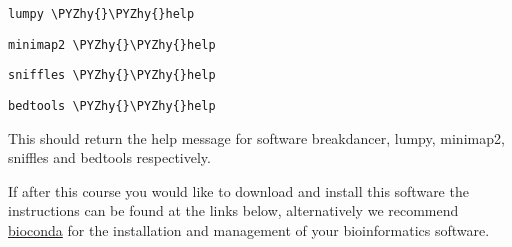 \documentclass[11pt]{article}
\makeatletter
\def\PYZhy{\char`\-}
\newcommand{\boxspacing}{\kern\kvtcb@left@rule\kern\kvtcb@boxsep}
\newcommand{\prompt}[4]{
        {\ttfamily\llap{{\color{blue}\LARGE\faKeyboardO\hspace{3pt}#4}}\vspace{-\baselineskip}}
    }
\makeatother
\begin{document}
    \begin{Verbatim}[commandchars=\\\{\}, frame=single, framerule=2mm, rulecolor=\color{outerrorbackground}]
    \end{Verbatim}

    \begin{tcolorbox}[breakable, size=fbox, boxrule=1pt, pad at break*=1mm,colback=cellbackground, colframe=cellborder]
\prompt{In}{incolor}{ }{\boxspacing}
\begin{Verbatim}[commandchars=\\\{\}]
lumpy \PYZhy{}\PYZhy{}help
\end{Verbatim}
\end{tcolorbox}

    \begin{tcolorbox}[breakable, size=fbox, boxrule=1pt, pad at break*=1mm,colback=cellbackground, colframe=cellborder]
\prompt{In}{incolor}{ }{\boxspacing}
\begin{Verbatim}[commandchars=\\\{\}]
minimap2 \PYZhy{}\PYZhy{}help
\end{Verbatim}
\end{tcolorbox}

    \begin{tcolorbox}[breakable, size=fbox, boxrule=1pt, pad at break*=1mm,colback=cellbackground, colframe=cellborder]
\prompt{In}{incolor}{ }{\boxspacing}
\begin{Verbatim}[commandchars=\\\{\}]
sniffles \PYZhy{}\PYZhy{}help
\end{Verbatim}
\end{tcolorbox}

    \begin{tcolorbox}[breakable, size=fbox, boxrule=1pt, pad at break*=1mm,colback=cellbackground, colframe=cellborder]
\prompt{In}{incolor}{ }{\boxspacing}
\begin{Verbatim}[commandchars=\\\{\}]
bedtools \PYZhy{}\PYZhy{}help
\end{Verbatim}
\end{tcolorbox}

    This should return the help message for software breakdancer, lumpy,
minimap2, sniffles and bedtools respectively.

If after this course you would like to download and install this
software the instructions can be found at the links below, alternatively
we recommend \href{https://bioconda.github.io/}{bioconda} for the
installation and management of your bioinformatics software.
\end{document}
